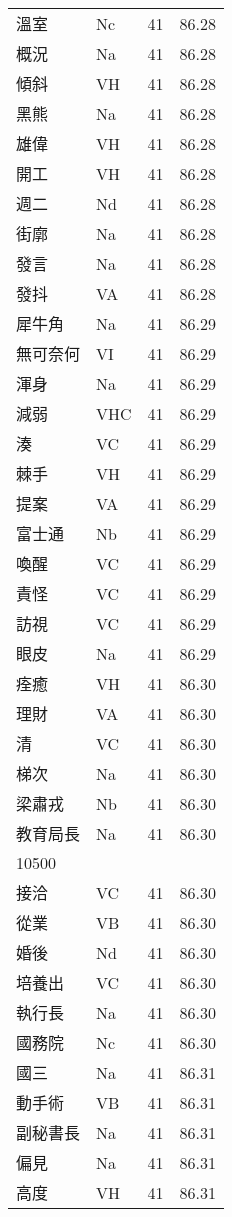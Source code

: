 \documentclass[twocolumn]{book}
\begin{document}
\begin{supertabular}{llrr}
溫室 & Nc & 41 &  86.28\\
概況 & Na & 41 &  86.28\\
傾斜 & VH & 41 &  86.28\\
黑熊 & Na & 41 &  86.28\\
雄偉 & VH & 41 &  86.28\\
開工 & VH & 41 &  86.28\\
週二 & Nd & 41 &  86.28\\
街廓 & Na & 41 &  86.28\\
發言 & Na & 41 &  86.28\\
發抖 & VA & 41 &  86.28\\
犀牛角 & Na & 41 &  86.29\\
無可奈何 & VI & 41 &  86.29\\
渾身 & Na & 41 &  86.29\\
減弱 & VHC & 41 &  86.29\\
湊 & VC & 41 &  86.29\\
棘手 & VH & 41 &  86.29\\
提案 & VA & 41 &  86.29\\
富士通 & Nb & 41 &  86.29\\
喚醒 & VC & 41 &  86.29\\
責怪 & VC & 41 &  86.29\\
訪視 & VC & 41 &  86.29\\
眼皮 & Na & 41 &  86.29\\
痊癒 & VH & 41 &  86.30\\
理財 & VA & 41 &  86.30\\
清 & VC & 41 &  86.30\\
梯次 & Na & 41 &  86.30\\
梁肅戎 & Nb & 41 &  86.30\\
教育局長 & Na & 41 &  86.30\\
10500\\
接洽 & VC & 41 &  86.30\\
從業 & VB & 41 &  86.30\\
婚後 & Nd & 41 &  86.30\\
培養出 & VC & 41 &  86.30\\
執行長 & Na & 41 &  86.30\\
國務院 & Nc & 41 &  86.30\\
國三 & Na & 41 &  86.31\\
動手術 & VB & 41 &  86.31\\
副秘書長 & Na & 41 &  86.31\\
偏見 & Na & 41 &  86.31\\
高度 & VH & 41 &  86.31\\

\end{supertabular}
\end{document}
